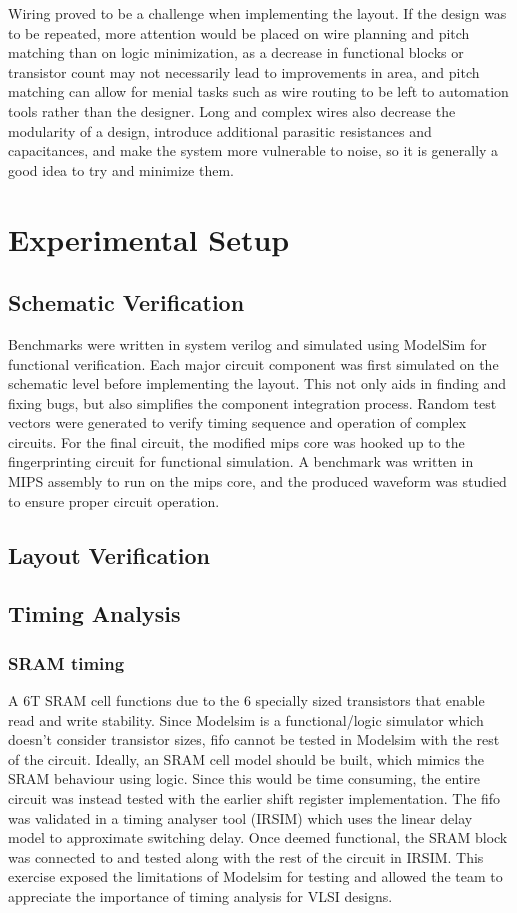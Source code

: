 \documentclass[12pt,journal,compsoc]{IEEEtran}
\begin{document}
Wiring proved to be a challenge when implementing the layout. If the design was to be repeated, more attention would be placed on wire planning and pitch matching than on logic minimization, as a decrease in functional blocks or transistor count may not necessarily lead to improvements in area, and pitch matching can allow for menial tasks such as wire routing to be left to automation tools rather than the designer. Long and complex wires also decrease the modularity of a design, introduce additional parasitic resistances and capacitances, and make the system more vulnerable to noise, so it is generally a good idea to try and minimize them.


\section{Experimental Setup}
\subsection{Schematic Verification}
Benchmarks were written in system verilog and simulated using ModelSim for functional verification. Each major circuit component was first simulated on the schematic level before implementing the layout. This not only aids in finding and fixing bugs, but also simplifies the component integration process. Random test vectors were generated to verify timing sequence and operation of complex circuits.
For the final circuit, the modified mips core was hooked up to the fingerprinting circuit for functional simulation. A benchmark was written in MIPS assembly to run on the mips core, and the produced waveform was studied to ensure proper circuit operation. 

\subsection{Layout Verification}
\subsection{Timing Analysis}
\subsubsection {SRAM timing}
A 6T SRAM cell functions due to the 6 specially sized transistors that enable read and write stability. Since Modelsim is a functional/logic simulator which doesn’t consider transistor sizes, fifo cannot be tested in Modelsim with the rest of the circuit. Ideally, an SRAM cell model should be built, which mimics the SRAM behaviour using logic. Since this would be time consuming, the entire circuit was instead tested with the earlier shift register implementation. The fifo was validated in a timing analyser tool (IRSIM) which uses the linear delay model to approximate switching delay. Once deemed functional, the SRAM block was connected to and tested along with the rest of the circuit in IRSIM. This exercise exposed the limitations of Modelsim for testing and allowed the team to appreciate the importance of timing analysis for VLSI designs.
\end{document}
